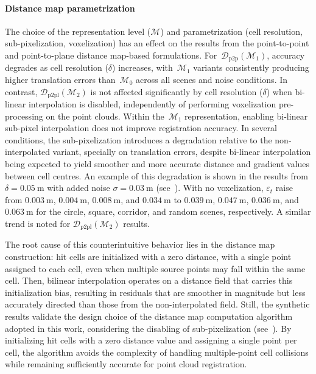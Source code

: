 \paragraph{Distance map parametrization}
The choice of the representation level ($\mathcal{M}$) and parametrization
(cell resolution, sub-pixelization, voxelization) has an effect on the results
from the point-to-point and point-to-plane distance map-based formulations.
For~$\mathcal{D}_\mathrm{p2p}(\mathcal{M}_1)$, accuracy degrades as cell resolution ($\delta$)
increases, with~$\mathcal{M}_1$ variants consistently producing higher
translation errors than~$\mathcal{M}_0$ across all scenes and noise conditions.
In contrast, $\mathcal{D}_\mathrm{p2pl}(\mathcal{M}_2)$ is not affected
significantly by cell resolution ($\delta$) when bi-linear interpolation is
disabled, independently of performing voxelization pre-processing on the point
clouds. Within the~$\mathcal{M}_1$ representation, enabling bi-linear sub-pixel
interpolation does not improve registration accuracy. In several conditions,
the sub-pixelization introduces a degradation relative to the non-interpolated
variant, specially on translation errors, despite bi-linear interpolation being
expected to yield smoother and more accurate distance and gradient values
between cell centres. An example of this degradation is shown in the results
from $\delta = \SI{0.05}{\metre}$ with added noise $\sigma = \SI{0.03}{\metre}$
(see~).
With no voxelization, $\varepsilon_t$ raise from $\SI{0.003}{\metre}$,
$\SI{0.004}{\metre}$, $\SI{0.008}{\metre}$, and $\SI{0.034}{\metre}$ to
$\SI{0.039}{\metre}$, $\SI{0.047}{\metre}$, $\SI{0.036}{\metre}$, and
$\SI{0.063}{\metre}$ for the circle, square, corridor, and random scenes,
respectively. A similar trend is noted for
$\mathcal{D}_\mathrm{p2pl}(\mathcal{M}_2)$ results.

The root cause of this counterintuitive behavior lies in the distance map
construction: hit cells are initialized with a zero distance,
with a single point assigned to each cell, even when multiple source points
may fall within the same cell. Then, bilinear interpolation operates on
a distance field that carries this initialization bias, resulting in residuals
that are smoother in magnitude but less accurately directed than those from
the non-interpolated field. Still, the synthetic results validate
the design choice of the distance map computation algorithm adopted in
this work, considering the disabling of sub-pixelization
(see~). By initializing hit cells with
a zero distance value and assigning a single point per cell, the algorithm
avoids the complexity of handling multiple-point cell collisions while remaining
sufficiently accurate for point cloud registration.


